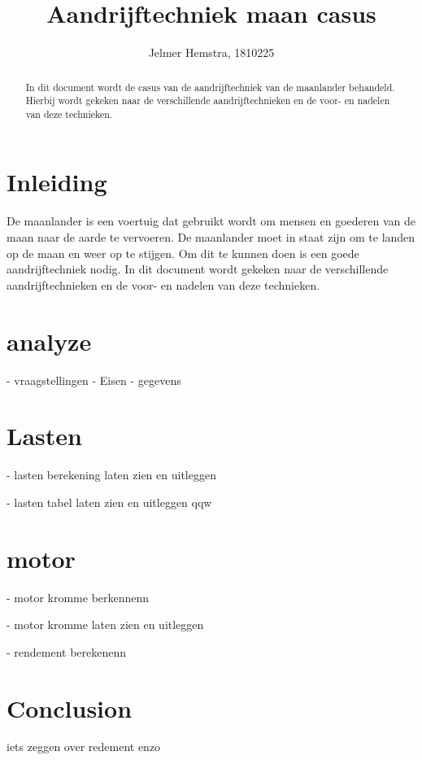 \documentclass{article}
\title{Aandrijftechniek maan casus}
\author{Jelmer Hemstra, 1810225}
\begin{document}
    \maketitle

    \begin{abstract}
        In dit document wordt de casus van de aandrijftechniek van de maanlander behandeld. Hierbij wordt gekeken naar de verschillende aandrijftechnieken en de voor- en nadelen van deze technieken.

    \end{abstract}


\section{Inleiding}
De maanlander is een voertuig dat gebruikt wordt om mensen en goederen van de maan naar de aarde te vervoeren. 
De maanlander moet in staat zijn om te landen op de maan en weer op te stijgen. 
Om dit te kunnen doen is een goede aandrijftechniek nodig. 
In dit document wordt gekeken naar de verschillende aandrijftechnieken en de voor- en nadelen van deze technieken.

\section{analyze}
- vraagstellingen 
- Eisen
- gegevens



\section{Lasten}
- lasten berekening laten zien en uitleggen


- lasten tabel laten zien en uitleggen
qqw





\section{motor}
- motor kromme berkennenn

- motor kromme laten zien en uitleggen

- rendement berekenenn


\section{Conclusion}

iets zeggen over redement enzo
\end{document}
